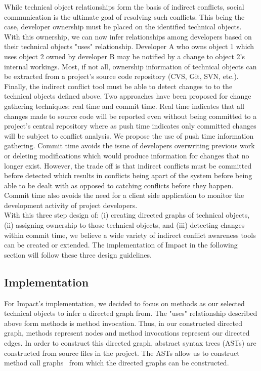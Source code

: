 \documentclass[conference]{IEEEtran}
\begin{document}
While technical object relationships form the basis of indirect conflicts,
social communication is the ultimate goal of resolving such conflicts.
This being the case, developer ownership must be placed on the 
identified technical objects. With this ownership, we can now infer
relationships among developers based on their technical objects
"uses" relationship. Developer A who owns object 1 which uses 
object 2 owned by developer B may be notified by a change to
object 2's internal workings. Most, if not all, ownership information
of technical objects can be extracted from a project's source code
repository (CVS, Git, SVN, etc.).\\

Finally, the indirect conflict tool must be able to detect changes to
to the technical objects defined above. Two approaches have been 
proposed for change gathering techniques: real time and commit time.
Real time indicates that all changes made to source code will be
reported even without being committed to a project's central 
repository where as push time indicates only committed changes
will be subject to conflict analysis. We propose the use of push time
information gathering. Commit time avoids the issue of developers 
overwriting previous work or deleting modifications which would 
produce information for changes that no longer exist. However, the
trade off is that indirect conflicts must be committed before detected
which results in conflicts being apart of the system before being able
to be dealt with as opposed to catching conflicts before they happen.
Commit time also avoids the need for a client side application to 
monitor the development activity of project developers.\\

With this three step design of: (i) creating directed graphs of technical
objects, (ii) assigning ownership to those technical objects, and (iii)
detecting changes within commit time, we believe a wide variety of
indirect conflict awareness tools can be created or extended. The
implementation of Impact in the following section will follow these
three design guidelines.

\subsection{Implementation}
For Impact's implementation, we decided to focus on methods as our
selected technical objects to infer a directed graph from. The "uses" 
relationship described above form methods is method invocation.
Thus, in our constructed directed graph, methods represent nodes
and method invocations represent our directed edges. In order to 
construct this directed graph, abstract syntax trees (ASTs) are 
constructed from source files in the project. The ASTs allow us
to construct method call graphs~\cite{} from which the directed 
graphs can be constructed.\\
\end{document}
